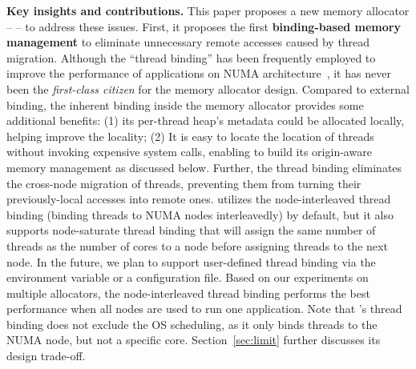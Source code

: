 

\textbf{Key insights and contributions.} This paper proposes a new memory allocator -- \NM{} -- to address these issues.  
First, it proposes the first \textbf{binding-based memory management} to eliminate unnecessary remote accesses caused by thread migration. Although the ``thread binding'' has been frequently employed to improve the performance of applications on NUMA architecture~\cite{li2013numa, XuNuma, Lepers:2015:TMP:2813767.2813788}, it has never been the \textit{first-class citizen} for the memory allocator design. Compared to external binding, the inherent  binding inside the memory allocator provides some additional benefits: (1) its per-thread heap's metadata could be allocated locally, helping improve the locality; (2) It is easy to locate the location of threads without invoking expensive system calls, enabling \NM{} to build its origin-aware memory management as discussed below. Further, the thread binding eliminates the cross-node migration of threads, preventing them from turning their previously-local accesses into remote ones. \NM{} utilizes the node-interleaved thread binding  (binding threads to NUMA nodes interleavedly) by default, but it also supports node-saturate thread binding that will assign the same number of threads as the number of cores to a node before assigning threads to the next node. In the future, we plan to support 
user-defined thread binding via the environment variable or a configuration file. Based on our experiments on multiple allocators, the node-interleaved thread binding performs the best performance when all nodes are used to run one application. Note that \NM{}'s thread binding does not exclude the OS scheduling, as it only binds threads to the NUMA node, but not a specific core. Section~\ref{sec:limit} further discusses its design trade-off.  


